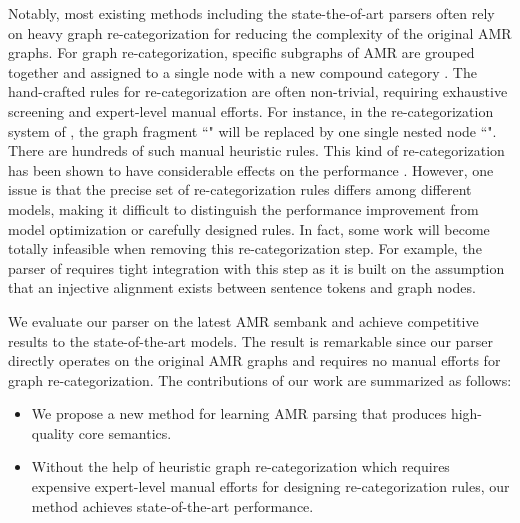 \documentclass[11pt,a4paper]{article}
\begin{document}
	Notably, most existing methods including the state-the-of-art parsers often rely on heavy graph re-categorization for reducing the complexity of the original AMR graphs. For graph re-categorization, specific subgraphs of AMR are grouped together and assigned to a single node with a new compound category \cite{werling2015robust,wang2017getting,foland2017abstract,lyu2018amr,groschwitz2018amr,guo2018better}. The hand-crafted rules for re-categorization are often non-trivial, requiring exhaustive screening and expert-level manual efforts. For instance, in the re-categorization system of , the graph fragment ``" will be replaced by one single nested node ``". There are hundreds of such manual heuristic rules. This kind of re-categorization has been shown to have considerable effects on the performance \cite{wang2017getting,guo2018better}. However, one issue is that the precise set of re-categorization rules differs among different models, making it difficult to distinguish the performance improvement from model optimization or carefully designed rules. In fact, some work will become totally infeasible when removing this re-categorization step. For example, the parser of  requires tight integration with this step as it is built on the assumption that an injective alignment exists between sentence tokens and graph nodes.
	
	We evaluate our parser on the latest AMR sembank and achieve competitive results to the state-of-the-art models. The result is remarkable since our parser directly operates on the original AMR graphs and requires no manual efforts for graph re-categorization. The contributions of our work are summarized as follows:
	\begin{itemize}
		\item We propose a new method for learning AMR parsing that produces high-quality core semantics.
		\item Without the help of heuristic graph re-categorization which requires expensive expert-level manual efforts for designing re-categorization rules, our method achieves state-of-the-art performance.
	\end{itemize}
\end{document}
